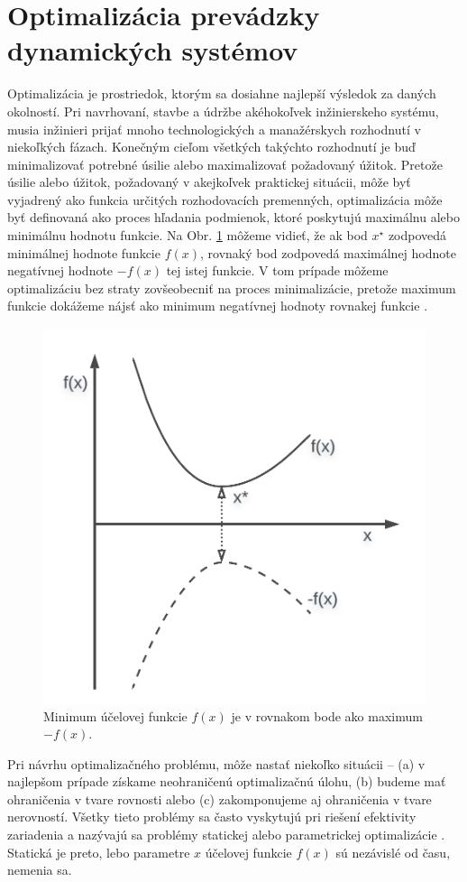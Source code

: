 \section{Optimalizácia prevádzky dynamických systémov}
Optimalizácia je prostriedok, ktorým sa dosiahne najlepší výsledok za daných okolností. Pri navrhovaní, stavbe a údržbe akéhokoľvek inžinierskeho systému, musia inžinieri prijať mnoho technologických a manažérskych rozhodnutí v niekoľkých fázach. Konečným cieľom všetkých takýchto rozhodnutí je buď minimalizovať potrebné úsilie alebo maximalizovať požadovaný úžitok. Pretože úsilie alebo úžitok, požadovaný v akejkoľvek praktickej situácii, môže byť vyjadrený ako funkcia určitých rozhodovacích premenných, optimalizácia môže byť definovaná ako proces hľadania podmienok, ktoré poskytujú maximálnu alebo minimálnu hodnotu funkcie. Na Obr. \ref{fig:cost_fun_ex} môžeme vidieť, že ak bod $ x^{\star} $ zodpovedá minimálnej hodnote funkcie $ f(x) $, rovnaký bod zodpovedá maximálnej hodnote negatívnej hodnote $ -f(x) $ tej istej funkcie. V tom prípade môžeme optimalizáciu bez straty zovšeobecniť na proces minimalizácie, pretože maximum funkcie dokážeme nájsť ako minimum negatívnej hodnoty rovnakej funkcie \cite{rao:intro_engin_opt:2009}. 

\begin{figure}
	\centering
	\includegraphics[width=0.5\linewidth]{images/optimization_obj}
	\caption{Minimum účelovej funkcie $ f(x) $ je v rovnakom bode ako maximum $ -f(x) $.}
	\label{fig:cost_fun_ex}
\end{figure}

Pri návrhu optimalizačného problému, môže nastať niekoľko situácii -- (a) v najlepšom prípade získame neohraničenú optimalizačnú úlohu, (b) budeme mať ohraničenia v tvare rovnosti alebo (c) zakomponujeme aj ohraničenia v tvare nerovností. Všetky tieto problémy sa často vyskytujú pri riešení efektivity zariadenia a nazývajú sa problémy statickej alebo parametrickej optimalizácie \cite{agrawal:static_opt:1999}. Statická je preto, lebo parametre $ x $ účelovej funkcie $ f(x) $ sú nezávislé od času, nemenia sa. 


